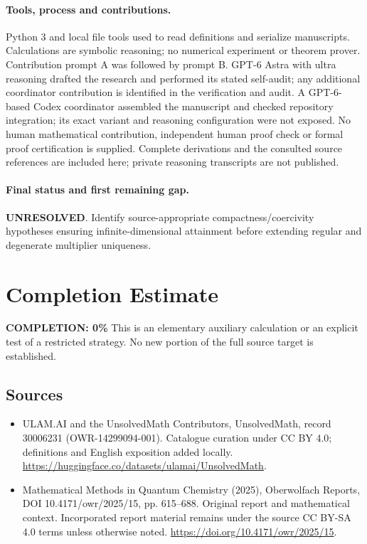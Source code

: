 \documentclass[11pt]{article}
\begin{document}
\paragraph{Tools, process and contributions.}
Python 3 and local file tools used to read definitions and serialize manuscripts. Calculations are symbolic reasoning; no numerical experiment or theorem prover. Contribution prompt A was followed by prompt B. GPT-6 Astra with ultra reasoning drafted the research and performed its stated self-audit; any additional coordinator contribution is identified in the verification and audit. A GPT-6-based Codex coordinator assembled the manuscript and checked repository integration; its exact variant and reasoning configuration were not exposed. No human mathematical contribution, independent human proof check or formal proof certification is supplied. Complete derivations and the consulted source references are included here; private reasoning transcripts are not published.

\paragraph{Final status and first remaining gap.}
\textbf{UNRESOLVED}. Identify source-appropriate compactness/coercivity hypotheses ensuring infinite-dimensional attainment before extending regular and degenerate multiplier uniqueness.

\section{Completion Estimate}
\noindent\textbf{COMPLETION: 0\%}
This is an elementary auxiliary calculation or an explicit test of a restricted strategy. No new portion of the full source target is established.

\subsection{Sources}
\begin{itemize}
\item[\hypertarget{source:30006231:1}{S1}] ULAM.AI and the UnsolvedMath Contributors, UnsolvedMath, record 30006231 (OWR-14299094-001). Catalogue curation under CC BY 4.0; definitions and English exposition added locally.
\url{https://huggingface.co/datasets/ulamai/UnsolvedMath}.
\item[\hypertarget{source:30006231:2}{S2}] Mathematical Methods in Quantum Chemistry (2025), Oberwolfach Reports, DOI 10.4171/owr/2025/15, pp. 615--688. Original report and mathematical context. Incorporated report material remains under the source CC BY-SA 4.0 terms unless otherwise noted.
\url{https://doi.org/10.4171/owr/2025/15}.
\end{itemize}
\label{end:30006231}
\end{document}
